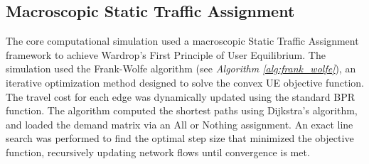 


\subsection{Macroscopic Static Traffic Assignment}
\label{sec:sta}

The core computational simulation used a macroscopic Static Traffic Assignment framework to achieve Wardrop's First Principle of User Equilibrium. The simulation used the Frank-Wolfe algorithm (see \textit{Algorithm \ref{alg:frank_wolfe}}), an iterative optimization method designed to solve the convex UE objective function. The travel cost for each edge was dynamically updated using the standard BPR function. The algorithm computed the shortest paths using Dijkstra's algorithm, and loaded the demand matrix via an All or Nothing assignment. An exact line search was performed to find the optimal step size that minimized the objective function, recursively updating network flows until convergence is met.

